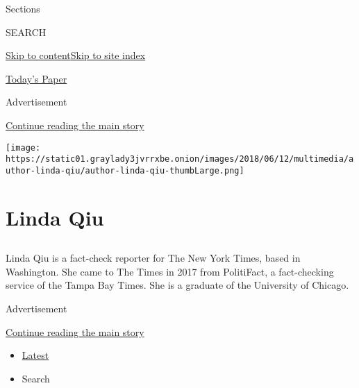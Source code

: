 Sections

SEARCH

\protect\hyperlink{site-content}{Skip to
content}\protect\hyperlink{site-index}{Skip to site index}

\href{https://myaccount.nytimes3xbfgragh.onion/auth/login?response_type=cookie\&client_id=vi}{}

\href{https://www.nytimes3xbfgragh.onion/section/todayspaper}{Today's
Paper}

Advertisement

\protect\hyperlink{after-top}{Continue reading the main story}

\texttt{[image: https://static01.graylady3jvrrxbe.onion/images/2018/06/12/multimedia/author-linda-qiu/author-linda-qiu-thumbLarge.png]}

\hypertarget{linda-qiu}{%
\section{Linda Qiu}\label{linda-qiu}}

\subsection{}

Linda Qiu is a fact-check reporter for The New York Times, based in
Washington. She came to The Times in 2017 from PolitiFact, a
fact-checking service of the Tampa Bay Times. She is a graduate of the
University of Chicago.

Advertisement

\protect\hyperlink{after-mid1}{Continue reading the main story}

\begin{itemize}
\tightlist
\item
  \protect\hyperlink{stream-panel}{Latest}
\item
  Search
\end{itemize}

